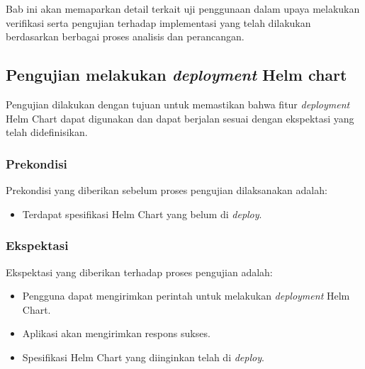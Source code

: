 \chapter{\babLima}
\label{bab:5}
Bab ini akan memaparkan detail terkait uji penggunaan dalam upaya melakukan
verifikasi serta pengujian terhadap implementasi yang telah dilakukan berdasarkan
berbagai proses analisis dan perancangan.


\section{Pengujian melakukan \textit{deployment} Helm chart}
Pengujian dilakukan dengan tujuan untuk memastikan bahwa fitur \textit{deployment} Helm Chart dapat digunakan dan dapat berjalan sesuai dengan ekspektasi yang telah didefinisikan.
\subsection{Prekondisi}
Prekondisi yang diberikan sebelum proses pengujian dilaksanakan adalah:
\begin{itemize}
    \item Terdapat spesifikasi Helm Chart yang belum di \textit{deploy}.
\end{itemize}
\subsection{Ekspektasi}
Ekspektasi yang diberikan terhadap proses pengujian adalah:
\begin{itemize}
    \item Pengguna dapat mengirimkan perintah untuk melakukan \textit{deployment} Helm Chart.
    \item Aplikasi akan mengirimkan respons sukses.
    \item Spesifikasi Helm Chart yang diinginkan telah di \textit{deploy}.
\end{itemize}
